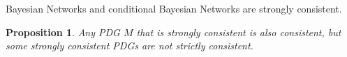 \documentclass{article}
\theoremstyle{plain}
\newtheorem{prop}[theorem]{Proposition}
\theoremstyle{definition}
\theoremstyle{remark}
\numberwithin{equation}{section}
\begin{document}
{\begin{vleftovers}
	\begin{example}
		Bayesian Networks and conditional Bayesian Networks are strongly consistent.
	\end{example}

	\begin{prop}
		Any PDG $M$ that is strongly consistent is also consistent, but some strongly consistent PDGs are not strictly consistent.
	\end{prop}




	\end{vleftovers}
}
\end{document}
